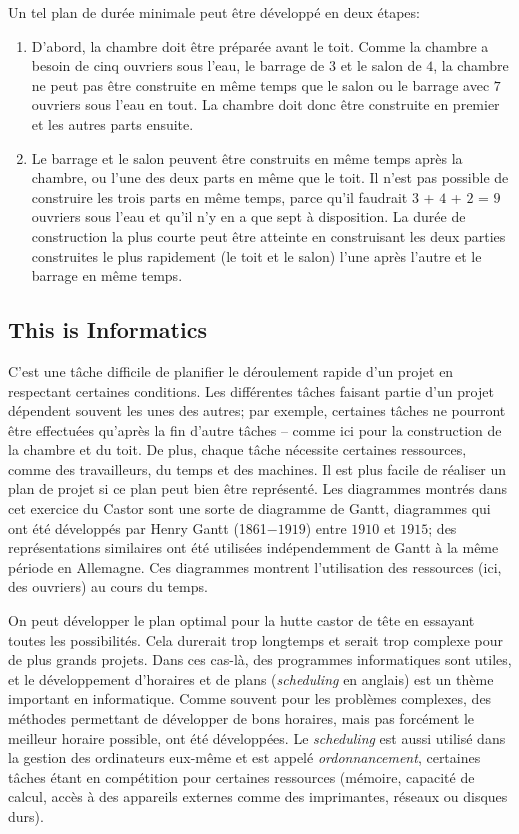\documentclass[a4paper,11pt]{report}
\begin{document}
Un tel plan de durée minimale peut être développé en deux étapes:

\begin{enumerate}
  \item D’abord, la chambre doit être préparée avant le toit. Comme la chambre a besoin de cinq ouvriers sous l’eau, le barrage de $3$ et le salon de $4$, la chambre ne peut pas être construite en même temps que le salon ou le barrage avec $7$ ouvriers sous l’eau en tout. La chambre doit donc être construite en premier et les autres parts ensuite.
  \item Le barrage et le salon peuvent être construits en même temps après la chambre, ou l’une des deux parts en même que le toit. Il n’est pas possible de construire les trois parts en même temps, parce qu’il faudrait $3$ + $4$ + $2$ = $9$ ouvriers sous l’eau et qu’il n’y en a que sept à disposition. La durée de construction la plus courte peut être atteinte en construisant les deux parties construites le plus rapidement (le toit et le salon) l’une après l’autre et le barrage en même temps.
\end{enumerate}


\subsection*{This is Informatics}

C’est une tâche difficile de planifier le déroulement rapide d’un projet en respectant certaines conditions. Les différentes tâches faisant partie d’un projet dépendent souvent les unes des autres; par exemple, certaines tâches ne pourront être effectuées qu’après la fin d’autre tâches – comme ici pour la construction de la chambre et du toit. De plus, chaque tâche nécessite certaines ressources, comme des travailleurs, du temps et des machines. Il est plus facile de réaliser un plan de projet si ce plan peut bien être représenté. Les diagrammes montrés dans cet exercice du Castor sont une sorte de diagramme de Gantt, diagrammes qui ont été développés par Henry Gantt (1861$-1919$) entre $1910$ et $1915$; des représentations similaires ont été utilisées indépendemment de Gantt à la même période en Allemagne. Ces diagrammes montrent l’utilisation des ressources (ici, des ouvriers) au cours du temps.

On peut développer le plan optimal pour la hutte castor de tête en essayant toutes les possibilités. Cela durerait trop longtemps et serait trop complexe pour de plus grands projets. Dans ces cas-là, des programmes informatiques sont utiles, et le développement d’horaires et de plans (\emph{scheduling} en anglais) est un thème important en informatique. Comme souvent pour les problèmes complexes, des méthodes permettant de développer de bons horaires, mais pas forcément le meilleur horaire possible, ont été développées. Le \emph{scheduling} est aussi utilisé dans la gestion des ordinateurs eux-même et est appelé \emph{ordonnancement}, certaines tâches étant en compétition pour certaines ressources (mémoire, capacité de calcul, accès à des appareils externes comme des imprimantes, réseaux ou disques durs).
\end{document}
